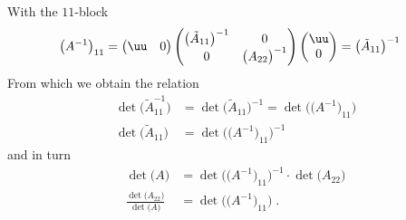 %
With the $11$-block
%
\begin{align*}
\big(A^{-1}\big)_{11} &= 
%
\begin{pmatrix}
  \uu& 0  
\end{pmatrix} 
\begin{pmatrix}
  \big(\tilde A_{11}\big)^{-1}& 0 \\
0  & \big(A_{22}\big)^{-1}
\end{pmatrix}
\begin{pmatrix}
  \uu  \\
  0 
\end{pmatrix}
=   \big(\tilde A_{11}\big)^{-1}
\end{align*}
%
From which we obtain the relation
%
\begin{align*}
\det\big(\tilde A_{11}^{-1}\big) &=\det\big(\tilde A_{11}\big)^{-1} =
\det\bigg( \big(A^{-1}\big)_{11}\bigg) \\
\det\big(\tilde A_{11}\big) &=
\det\bigg( \big(A^{-1}\big)_{11}\bigg)^{-1}
\end{align*}
%
and in turn
\begin{align}\label{eq:det:ratio}
\det\big(A\big) &= 
\det\bigg( \big(A^{-1}\big)_{11}\bigg)^{-1}
\cdot \det\big( A_{22} \big)\\
\frac{ \det\big( A_{22} \big)}{\det\big(A\big)} &=\det\bigg( \big(A^{-1}\big)_{11}\bigg)\;.
\end{align}

%
